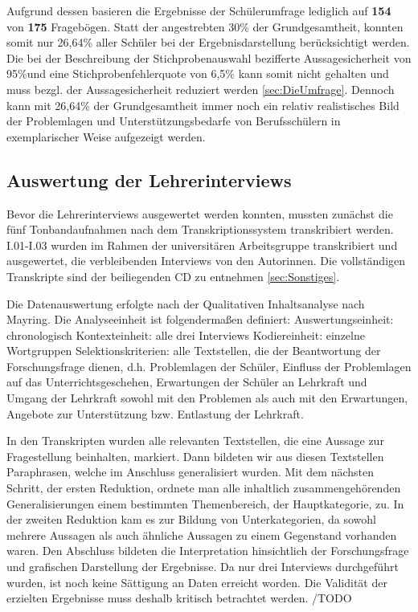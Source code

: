 Aufgrund dessen basieren die Ergebnisse der Schülerumfrage lediglich auf \textbf{154} von \textbf{175} Fragebögen. Statt der angestrebten 30\% der Grundgesamtheit, konnten somit nur 26,64\% aller Schüler bei der Ergebnisdarstellung berücksichtigt werden. Die bei der Beschreibung der Stichprobenauswahl bezifferte Aussagesicherheit von 95\%und eine Stichprobenfehlerquote von 6,5\% kann somit nicht gehalten und muss bezgl. der Aussagesicherheit reduziert werden \ref{sec:DieUmfrage}. Dennoch kann mit 26,64\% der Grundgesamtheit immer noch ein relativ realistisches Bild der Problemlagen und Unterstützungsbedarfe von Berufsschülern in exemplarischer Weise aufgezeigt werden.

\subsection{Auswertung der Lehrerinterviews}
\label{sec:AuswertungDerLehrerinterviews}

Bevor die Lehrerinterviews ausgewertet werden konnten, mussten zunächst die fünf Tonbandaufnahmen nach dem Transkriptionssystem transkribiert werden. I.01-I.03 wurden im Rahmen der universitären Arbeitsgruppe transkribiert und ausgewertet, die verbleibenden Interviews von den Autorinnen. Die vollständigen Transkripte sind der beiliegenden CD zu entnehmen \ref{sec:Sonstiges}.

Die Datenauswertung erfolgte nach der Qualitativen Inhaltsanalyse nach Mayring.
Die Analyseeinheit ist folgendermaßen definiert:
Auswertungseinheit: chronologisch
Kontexteinheit: alle drei Interviews
Kodiereinheit: einzelne Wortgruppen
Selektionskriterien: alle Textstellen, die der Beantwortung der Forschungsfrage dienen, d.h. Problemlagen der Schüler, Einfluss der Problemlagen auf das Unterrichtsgeschehen, Erwartungen der Schüler an Lehrkraft und Umgang der Lehrkraft sowohl mit den Problemen als auch mit den Erwartungen, Angebote zur Unterstützung bzw. Entlastung der Lehrkraft.

In den Transkripten wurden alle relevanten Textstellen, die eine Aussage zur Fragestellung beinhalten, markiert. Dann bildeten wir aus diesen Textstellen Paraphrasen, welche im Anschluss generalisiert wurden. Mit dem nächsten Schritt, der ersten Reduktion, ordnete man alle inhaltlich zusammengehörenden Generalisierungen einem bestimmten Themenbereich, der Hauptkategorie, zu. In der zweiten Reduktion kam es zur Bildung von Unterkategorien, da sowohl mehrere Aussagen als auch ähnliche Aussagen zu einem Gegenstand vorhanden waren. Den Abschluss bildeten die Interpretation hinsichtlich der Forschungsfrage und grafischen Darstellung der Ergebnisse.
Da nur drei Interviews durchgeführt wurden, ist noch keine Sättigung an Daten erreicht worden. Die Validität der erzielten Ergebnisse muss deshalb kritisch betrachtet werden.
/TODO

